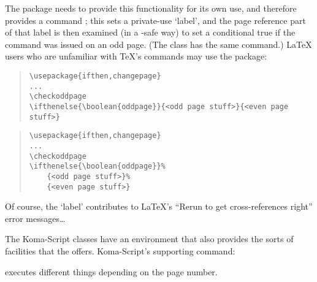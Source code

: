 The  package needs to provide this functionality
for its own use, and therefore provides a command ;
this sets a private-use `label', and the page reference part of that
label is then examined (in a -safe way) to set a
conditional  true if the command was issued on an odd
page.  (The  class has the same command.)  \LaTeX{}
users who are unfamiliar with \TeX{}'s  commands may use
the  package:
\begin{wideversion}
\begin{quote}
\begin{verbatim}
\usepackage{ifthen,changepage}
...
\checkoddpage
\ifthenelse{\boolean{oddpage}}{<odd page stuff>}{<even page stuff>}
\end{verbatim}
\end{quote}
\end{wideversion}
\begin{narrowversion}
\begin{quote}
\begin{verbatim}
\usepackage{ifthen,changepage}
...
\checkoddpage
\ifthenelse{\boolean{oddpage}}%
    {<odd page stuff>}%
    {<even page stuff>}
\end{verbatim}
\end{quote}
\end{narrowversion}

Of course, the `label' contributes to \LaTeX{}'s ``Rerun to get
cross-references right'' error messages\dots{}

The Koma-Script classes have an  environment
that also provides the sorts of facilities that the 
offers.  Koma-Script's supporting command:
\begin{quote}
\end{quote}
executes different things depending on the page number.

